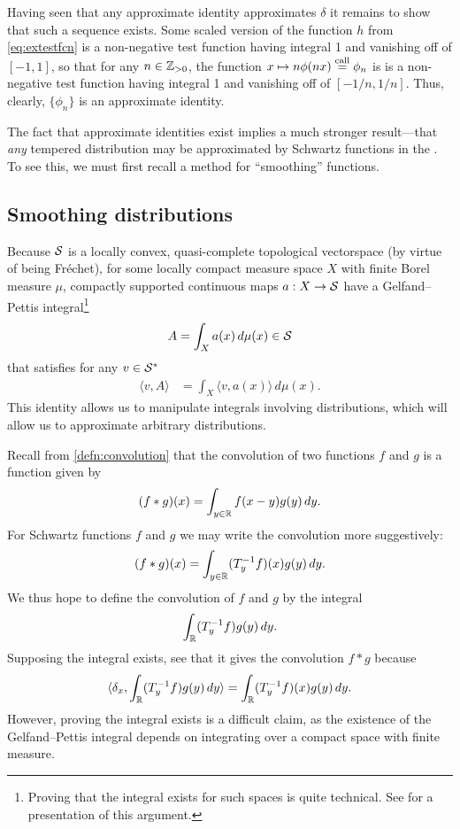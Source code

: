     Having seen that any approximate identity approximates $\delta$ it remains to show that such a sequence exists.
    Some scaled version of the function $h$ from \cref{eq:extestfcn} is a non-negative test function having integral 1 and vanishing off of $[-1,1]$, so that for any $n\in\Z_{>0}$, the function $x\mapsto n\phi(nx) \call \phi_n$ is is a non-negative test function having integral 1 and vanishing off of $[-1/n,1/n]$.
    Thus, clearly, $\{\phi_n\}$ is an approximate identity.

    The fact that approximate identities exist implies a much stronger result---that \emph{any} tempered distribution may be approximated by Schwartz functions in the \ws.
    To see this, we must first recall a method for ``smoothing'' functions.

  \subsection{Smoothing distributions}
    Because $\S$ is a locally convex, quasi-complete topological vectorspace (by virtue of being Fr\'echet), for some locally compact measure space $X$ with finite Borel measure $\mu$, compactly supported continuous maps $a:X\rightarrow\S$ have a Gelfand--Pettis integral\footnote{Proving that the \gp integral exists for such spaces is quite technical. See \citet{vvint} for a presentation of this argument.}
    \begin{align*}
      A = \int_X a(x)\,d\mu(x) \in\S
    \end{align*}
    that satisfies for any $v\in\SS$
    \begin{align*}
      \langle v, A\rangle
      &= \int_X \langle v, a(x)\rangle\,d\mu(x) \text{.}
    \end{align*}
    This identity allows us to manipulate integrals involving distributions, which will allow us to approximate arbitrary distributions.

    Recall from \cref{defn:convolution} that the convolution of two functions $f$ and $g$ is a function given by
    \begin{align*}
      (f*g)(x) = \int_{y\in\R} f(x-y)g(y)\,dy \text{.}
    \end{align*}
    For Schwartz functions $f$ and $g$ we may write the convolution more suggestively:
    \begin{align*}
      (f*g)(x) = \int_{y\in\R} (T_y\inv f)(x)g(y)\,dy \text{.}
    \end{align*}
    We thus hope to define the convolution of $f$ and $g$ by the \gp integral
    \begin{align*}
      \int_\R (T_y\inv f)g(y)\,dy \text{.}
    \end{align*}
    Supposing the integral exists, see that it gives the convolution $f*g$ because
    \begin{align*}
      \langle\delta_x, \int_\R (T_y\inv f)g(y)\,dy\rangle 
      = \int_\R (T_y\inv f)(x)g(y)\,dy \text{.}
    \end{align*}
    However, proving the integral exists is a difficult claim, as the existence of the Gelfand--Pettis integral depends on integrating over a compact space with finite measure.

